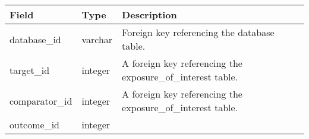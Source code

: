 \documentclass[
]{article}
\begin{document}
\begin{longtable}[]{@{}lll@{}}
\toprule
\begin{minipage}[b]{0.23\columnwidth}\raggedright
Field\strut
\end{minipage} & \begin{minipage}[b]{0.18\columnwidth}\raggedright
Type\strut
\end{minipage} & \begin{minipage}[b]{0.50\columnwidth}\raggedright
Description\strut
\end{minipage}\tabularnewline
\midrule
\endhead
\begin{minipage}[t]{0.23\columnwidth}\raggedright
database\_id\strut
\end{minipage} & \begin{minipage}[t]{0.18\columnwidth}\raggedright
varchar\strut
\end{minipage} & \begin{minipage}[t]{0.50\columnwidth}\raggedright
Foreign key referencing the database table.\strut
\end{minipage}\tabularnewline
\begin{minipage}[t]{0.23\columnwidth}\raggedright
target\_id\strut
\end{minipage} & \begin{minipage}[t]{0.18\columnwidth}\raggedright
integer\strut
\end{minipage} & \begin{minipage}[t]{0.50\columnwidth}\raggedright
A foreign key referencing the exposure\_of\_interest table.\strut
\end{minipage}\tabularnewline
\begin{minipage}[t]{0.23\columnwidth}\raggedright
comparator\_id\strut
\end{minipage} & \begin{minipage}[t]{0.18\columnwidth}\raggedright
integer\strut
\end{minipage} & \begin{minipage}[t]{0.50\columnwidth}\raggedright
A foreign key referencing the exposure\_of\_interest table.\strut
\end{minipage}\tabularnewline
\begin{minipage}[t]{0.23\columnwidth}\raggedright
outcome\_id\strut
\end{minipage} & \begin{minipage}[t]{0.18\columnwidth}\raggedright
integer\strut
\end{minipage} & \begin{minipage}[t]{0.50\columnwidth}\raggedright

\end{minipage}
\end{longtable}
\end{document}
